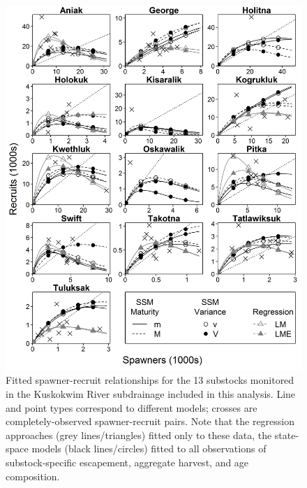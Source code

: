 \documentclass[12pt,]{book}
\theoremstyle{definition}
\theoremstyle{definition}
\theoremstyle{definition}
\theoremstyle{remark}
\begin{document}
\begin{figure}
  \centering
  \includegraphics{img/Ch4/R-v-S.jpg}
  \caption{Fitted spawner-recruit relationships for the 13 substocks monitored in the Kuskokwim River subdrainage included in this analysis. Line and point types correspond to different models; crosses are completely-observed spawner-recruit pairs. Note that the regression approaches (grey lines/triangles) fitted only to these data, the state-space models (black lines/circles) fitted to all observations of substock-specific escapement, aggregate harvest, and age composition.}
  \label{fig:r-v-s}
\end{figure}

\clearpage
\pagestyle{plain}
\end{document}

